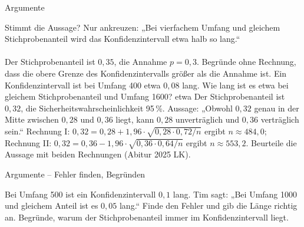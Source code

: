 \setcounter{aufgabe}{13}

\begin{aufgabe}{Argumente}
\begin{teile}
\teil Stimmt die Aussage? Nur ankreuzen: „Bei vierfachem Umfang und gleichem Stichprobenanteil wird das Konfidenzintervall etwa halb so lang.“ \\  \\ 
\teil Der Stichprobenanteil ist $0{,}35$, die Annahme $p = 0{,}3$. Begründe ohne Rechnung, dass die obere Grenze des Konfidenzintervalls größer als die Annahme ist.
\teil Ein Konfidenzintervall ist bei Umfang 400 etwa $0{,}08$ lang. Wie lang ist es etwa bei gleichem Stichprobenanteil und Umfang 1600? etwa \leerfeld
\teil Der Stichprobenanteil ist $0{,}32$, die Sicherheitswahrscheinlichkeit 95\,\%. Aussage: „Obwohl $0{,}32$ genau in der Mitte zwischen $0{,}28$ und $0{,}36$ liegt, kann $0{,}28$ unverträglich und $0{,}36$ verträglich sein.“ Rechnung I: $0{,}32 = 0{,}28 + 1{,}96 \cdot \sqrt{0{,}28 \cdot 0{,}72 / n}$ ergibt $n \approx 484{,}0$; Rechnung II: $0{,}32 = 0{,}36 - 1{,}96 \cdot \sqrt{0{,}36 \cdot 0{,}64 / n}$ ergibt $n \approx 553{,}2$. Beurteile die Aussage mit beiden Rechnungen \hfill (Abitur 2025 LK).
\end{teile}
\end{aufgabe}

\begin{aufgabe}{Argumente – Fehler finden, Begründen}
\begin{teile}
\teil Bei Umfang 500 ist ein Konfidenzintervall $0{,}1$ lang. Tim sagt: „Bei Umfang 1000 und gleichem Anteil ist es $0{,}05$ lang.“ Finde den Fehler und gib die Länge richtig an.
\teil Begründe, warum der Stichprobenanteil immer im Konfidenzintervall liegt.
\end{teile}
\end{aufgabe}
